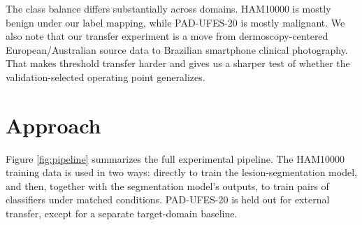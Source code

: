 \documentclass[10pt]{article}
\begin{document}
The class balance differs substantially across domains. HAM10000 is mostly benign under our label mapping, while PAD-UFES-20 is mostly malignant. We also note that our transfer experiment is a move from dermoscopy-centered European/Australian source data to Brazilian smartphone clinical photography. That makes threshold transfer harder and gives us a sharper test of whether the validation-selected operating point generalizes.

\section{Approach}

Figure \ref{fig:pipeline} summarizes the full experimental pipeline. The HAM10000 training data is used in two ways: directly to train the lesion-segmentation model, and then, together with the segmentation model's outputs, to train pairs of classifiers under matched conditions. PAD-UFES-20 is held out for external transfer, except for a separate target-domain baseline.
\end{document}
